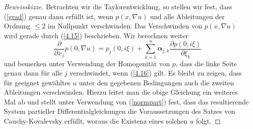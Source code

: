 \begin{proof} [Beweisskizze]
Betrachten wir die Taylorentwicklung, so stellen wir fest, dass (\ref{grad}) genau dann erfüllt ist, wenn $p(x,\nabla u)$ und alle Ableitungen der Ordnung $\le 2$ im Nullpunkt verschwinden. Das Verschwinden von $p(x,\nabla u)$ wird gerade durch (\ref{4.15}) beschrieben. Wir berechnen weiter
\[
\dfrac{\partial}{\partial x_j} p(0,\nabla u) = 
p_j(0,i\xi) + \sum_{k=1}^{n} \boldsymbol\alpha_{j,k} \dfrac{\partial p(0,i\xi)}{\partial \xi_k}
\]
und bemerken unter Verwendung der Homogenität von $p$, dass die linke Seite genau dann für alle $j$ verschwindet, wenn (\ref{4.16}) gilt. Es bleibt zu zeigen, dass für geeignet gewähltes $u$ unter den gegebenen Bedingungen auch die zweiten Ableitungen verschwinden. Hierzu leitet man die obige Gleichung ein weiteres Mal ab und stellt unter Verwendung von (\ref{normpart}) fest, dass das resultierende System partieller Differentialgleichungen die Voraussetzungen des Satzes von Cauchy-Kovalevsky erfüllt, woraus die Existenz eines solchen $u$ folgt.
\end{proof}

